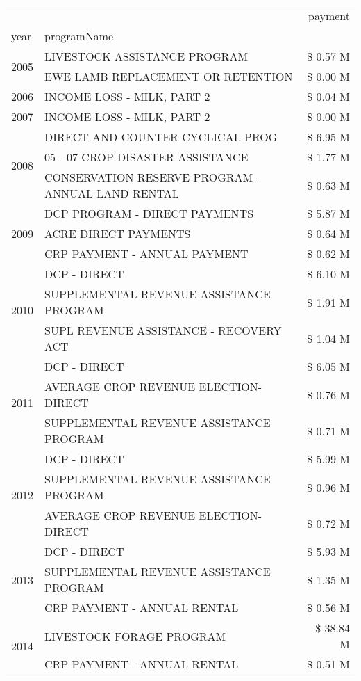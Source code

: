 \begin{tabular}{llr}
\toprule
 &  & payment \\
year & programName &  \\
\midrule
\multirow[t]{2}{*}{2005} & LIVESTOCK ASSISTANCE PROGRAM & \$ 0.57 M \\
 & EWE LAMB REPLACEMENT OR RETENTION & \$ 0.00 M \\
\cline{1-3}
2006 & INCOME LOSS - MILK, PART 2 & \$ 0.04 M \\
\cline{1-3}
2007 & INCOME LOSS - MILK, PART 2 & \$ 0.00 M \\
\cline{1-3}
\multirow[t]{3}{*}{2008} & DIRECT AND COUNTER CYCLICAL PROG & \$ 6.95 M \\
 & 05 - 07 CROP DISASTER ASSISTANCE & \$ 1.77 M \\
 & CONSERVATION RESERVE PROGRAM - ANNUAL LAND RENTAL & \$ 0.63 M \\
\cline{1-3}
\multirow[t]{3}{*}{2009} & DCP PROGRAM - DIRECT PAYMENTS & \$ 5.87 M \\
 & ACRE DIRECT PAYMENTS & \$ 0.64 M \\
 & CRP PAYMENT - ANNUAL PAYMENT & \$ 0.62 M \\
\cline{1-3}
\multirow[t]{3}{*}{2010} & DCP - DIRECT & \$ 6.10 M \\
 & SUPPLEMENTAL REVENUE ASSISTANCE PROGRAM & \$ 1.91 M \\
 & SUPL REVENUE ASSISTANCE - RECOVERY ACT & \$ 1.04 M \\
\cline{1-3}
\multirow[t]{3}{*}{2011} & DCP - DIRECT & \$ 6.05 M \\
 & AVERAGE CROP REVENUE ELECTION-DIRECT & \$ 0.76 M \\
 & SUPPLEMENTAL REVENUE ASSISTANCE PROGRAM & \$ 0.71 M \\
\cline{1-3}
\multirow[t]{3}{*}{2012} & DCP - DIRECT & \$ 5.99 M \\
 & SUPPLEMENTAL REVENUE ASSISTANCE PROGRAM & \$ 0.96 M \\
 & AVERAGE CROP REVENUE ELECTION-DIRECT & \$ 0.72 M \\
\cline{1-3}
\multirow[t]{3}{*}{2013} & DCP - DIRECT & \$ 5.93 M \\
 & SUPPLEMENTAL REVENUE ASSISTANCE PROGRAM & \$ 1.35 M \\
 & CRP PAYMENT - ANNUAL RENTAL & \$ 0.56 M \\
\cline{1-3}
\multirow[t]{3}{*}{2014} & LIVESTOCK FORAGE PROGRAM & \$ 38.84 M \\
 & CRP PAYMENT - ANNUAL RENTAL & \$ 0.51 M \\

\end{tabular}

